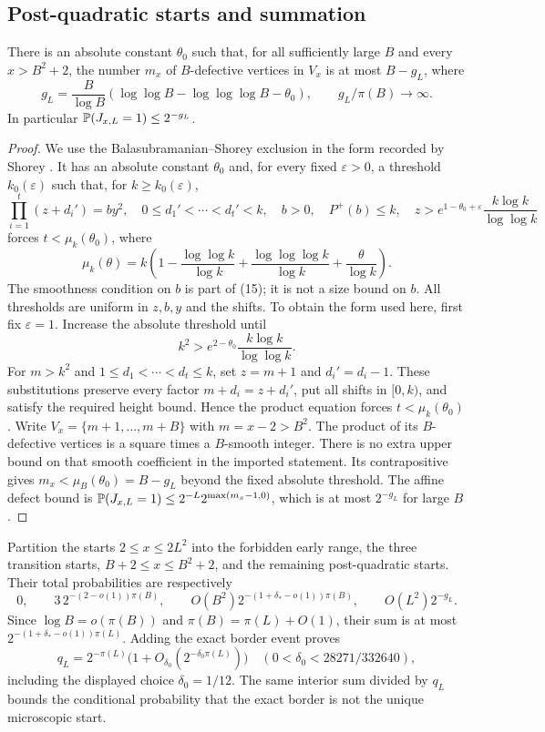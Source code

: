 \subsection{Post-quadratic starts and summation}
\begin{lemma}\label{supp:lem:pointwise-maximum}
There is an absolute constant $\theta_0$ such that, for all sufficiently
large $B$ and every $x>B^2+2$, the number $m_x$ of $B$-defective
vertices in $V_x$ is at most $B-g_L$, where
\[
 g_L=\frac B{\log B}
       (\log\log B-\log\log\log B-\theta_0),
 \qquad g_L/\pi(B)\longrightarrow\infty.
\]
In particular $\mathbb P(J_{x,L}=1)\le2^{-g_L}$.
\end{lemma}
\begin{proof}
We use the Balasubramanian--Shorey exclusion
\cite{BalasubramanianShorey1993} in the form recorded by Shorey
\cite[pp.~55--56, equation (15) with exponent $2$ and the subsequent
square-case statement]{Shorey1994BakerApplications}.
It has an absolute constant $\theta_0$ and, for every fixed $\varepsilon>0$,
a threshold $k_0(\varepsilon)$ such that, for $k\ge k_0(\varepsilon)$,
\[
 \prod_{i=1}^t(z+d_i')=by^2,\quad
 0\le d_1'<\cdots<d_t'<k,\quad b>0,\quad P^+(b)\le k,
 \quad z>e^{1-\theta_0+\varepsilon}\frac{k\log k}{\log\log k}
\]
forces $t<\mu_k(\theta_0)$, where
\[
 \mu_k(\theta)=k\left(1-\frac{\log\log k}{\log k}
       +\frac{\log\log\log k}{\log k}+\frac\theta{\log k}\right).
\]
The smoothness condition on $b$ is part of (15); it is not a size
bound on $b$. All thresholds are uniform in $z,b,y$ and the shifts.
To obtain the form used here, first fix $\varepsilon=1$. Increase the
absolute threshold until
\[
 k^2>e^{2-\theta_0}\frac{k\log k}{\log\log k}.
\]
For $m>k^2$ and $1\le d_1<\cdots<d_t\le k$, set
$z=m+1$ and $d_i'=d_i-1$. These substitutions preserve every factor
$m+d_i=z+d_i'$, put all shifts in $[0,k)$, and satisfy the required
height bound. Hence the product equation forces $t<\mu_k(\theta_0)$.
Write $V_x=\{m+1,\ldots,m+B\}$ with $m=x-2>B^2$.
The product of its $B$-defective vertices is a square times a
$B$-smooth integer. There is no extra upper bound on that smooth
coefficient in the imported statement. Its contrapositive gives
$m_x<\mu_B(\theta_0)=B-g_L$ beyond the fixed absolute threshold.
The affine defect bound is
$\mathbb P(J_{x,L}=1)\le2^{-L}2^{\max(m_x-1,0)}$, which is at most
$2^{-g_L}$ for large $B$.
\end{proof}

Partition the starts $2\le x\le2L^2$ into the forbidden early range,
the three transition starts, $B+2\le x\le B^2+2$, and the remaining
post-quadratic starts. Their total probabilities are respectively
\[
 0,\qquad 3\,2^{-(2-o(1))\pi(B)},\qquad
 O(B^2)2^{-(1+\delta_*-o(1))\pi(B)},\qquad
 O(L^2)2^{-g_L}.
\]
Since $\log B=o(\pi(B))$ and $\pi(B)=\pi(L)+O(1)$, their sum is
at most $2^{-(1+\delta_*-o(1))\pi(L)}$.
Adding the exact border event proves
\[
 q_L=2^{-\pi(L)}\bigl(1+O_{\delta_0}(2^{-\delta_0\pi(L)})\bigr)
 \quad(0<\delta_0<28271/332640),
\]
including the displayed choice $\delta_0=1/12$.
The same interior sum divided by $q_L$ bounds the conditional
probability that the exact border is not the unique microscopic start.


